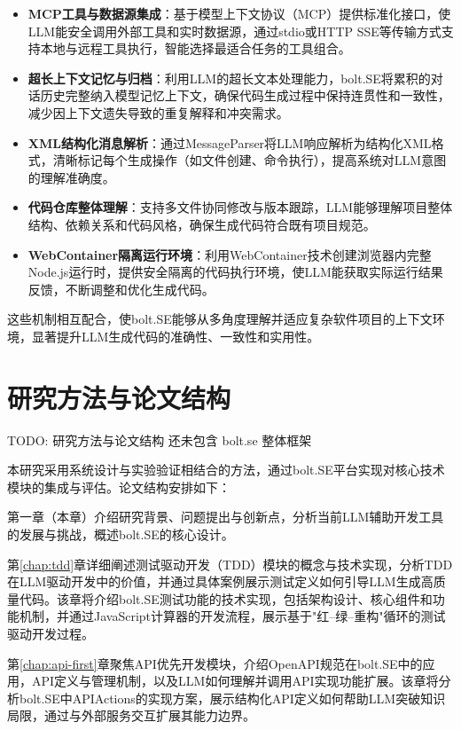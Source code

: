 \begin{itemize}
    \item \textbf{MCP工具与数据源集成}：基于模型上下文协议（MCP）提供标准化接口，使LLM能安全调用外部工具和实时数据源，通过stdio或HTTP SSE等传输方式支持本地与远程工具执行，智能选择最适合任务的工具组合。
    
    \item \textbf{超长上下文记忆与归档}：利用LLM的超长文本处理能力，bolt.SE将累积的对话历史完整纳入模型记忆上下文，确保代码生成过程中保持连贯性和一致性，减少因上下文遗失导致的重复解释和冲突需求。
    
    \item \textbf{XML结构化消息解析}：通过MessageParser将LLM响应解析为结构化XML格式，清晰标记每个生成操作（如文件创建、命令执行），提高系统对LLM意图的理解准确度。
    
    \item \textbf{代码仓库整体理解}：支持多文件协同修改与版本跟踪，LLM能够理解项目整体结构、依赖关系和代码风格，确保生成代码符合既有项目规范。
    
    \item \textbf{WebContainer隔离运行环境}：利用WebContainer技术创建浏览器内完整Node.js运行时，提供安全隔离的代码执行环境，使LLM能获取实际运行结果反馈，不断调整和优化生成代码。
\end{itemize}

这些机制相互配合，使bolt.SE能够从多角度理解并适应复杂软件项目的上下文环境，显著提升LLM生成代码的准确性、一致性和实用性。

\section{研究方法与论文结构}
TODO: 研究方法与论文结构 还未包含 bolt.se 整体框架

本研究采用系统设计与实验验证相结合的方法，通过bolt.SE平台实现对核心技术模块的集成与评估。论文结构安排如下：

第一章（本章）介绍研究背景、问题提出与创新点，分析当前LLM辅助开发工具的发展与挑战，概述bolt.SE的核心设计。

第\ref{chap:tdd}章详细阐述测试驱动开发（TDD）模块的概念与技术实现，分析TDD在LLM驱动开发中的价值，并通过具体案例展示测试定义如何引导LLM生成高质量代码。该章将介绍bolt.SE测试功能的技术实现，包括架构设计、核心组件和功能机制，并通过JavaScript计算器的开发流程，展示基于"红–绿–重构"循环的测试驱动开发过程。

第\ref{chap:api-first}章聚焦API优先开发模块，介绍OpenAPI规范在bolt.SE中的应用，API定义与管理机制，以及LLM如何理解并调用API实现功能扩展。该章将分析bolt.SE中APIActions的实现方案，展示结构化API定义如何帮助LLM突破知识局限，通过与外部服务交互扩展其能力边界。

